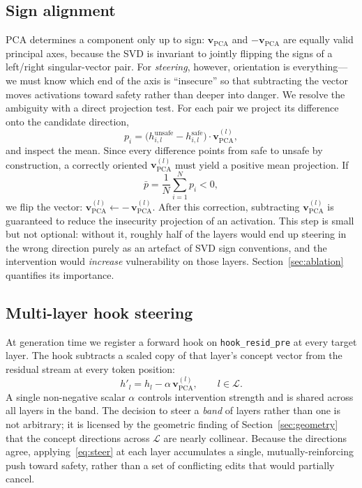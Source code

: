 \documentclass[11pt,a4paper]{article}
\newcommand{\vpca}{\mathbf{v}_{\text{PCA}}}
\begin{document}
\subsection{Sign alignment}
\label{sec:sign}
PCA determines a component only up to sign: $\vpca$ and $-\vpca$ are equally valid principal axes, because the SVD is invariant to jointly flipping the signs of a left/right singular-vector pair. For \emph{steering}, however, orientation is everything---we must know which end of the axis is ``insecure'' so that subtracting the vector moves activations toward safety rather than deeper into danger. We resolve the ambiguity with a direct projection test. For each pair we project its difference onto the candidate direction,
\begin{equation}
p_i = \big(h^{\text{unsafe}}_{i,l} - h^{\text{safe}}_{i,l}\big) \cdot \vpca^{(l)},
\end{equation}
and inspect the mean. Since every difference points from safe to unsafe by construction, a correctly oriented $\vpca^{(l)}$ must yield a positive mean projection. If
\begin{equation}
\bar{p} = \frac{1}{N}\sum_{i=1}^{N} p_i < 0,
\end{equation}
we flip the vector: $\vpca^{(l)} \leftarrow -\,\vpca^{(l)}$. After this correction, subtracting $\vpca^{(l)}$ is guaranteed to reduce the insecurity projection of an activation. This step is small but not optional: without it, roughly half of the layers would end up steering in the wrong direction purely as an artefact of SVD sign conventions, and the intervention would \emph{increase} vulnerability on those layers. Section~\ref{sec:ablation} quantifies its importance.

\subsection{Multi-layer hook steering}
\label{sec:steering}
At generation time we register a forward hook on \texttt{hook\_resid\_pre} at every target layer. The hook subtracts a scaled copy of that layer's concept vector from the residual stream at every token position:
\begin{equation}
h'_l = h_l - \alpha\,\vpca^{(l)}, \qquad l \in \mathcal{L}.
\label{eq:steer}
\end{equation}
A single non-negative scalar $\alpha$ controls intervention strength and is shared across all layers in the band. The decision to steer a \emph{band} of layers rather than one is not arbitrary; it is licensed by the geometric finding of Section~\ref{sec:geometry} that the concept directions across $\mathcal{L}$ are nearly collinear. Because the directions agree, applying~\eqref{eq:steer} at each layer accumulates a single, mutually-reinforcing push toward safety, rather than a set of conflicting edits that would partially cancel.
\end{document}
